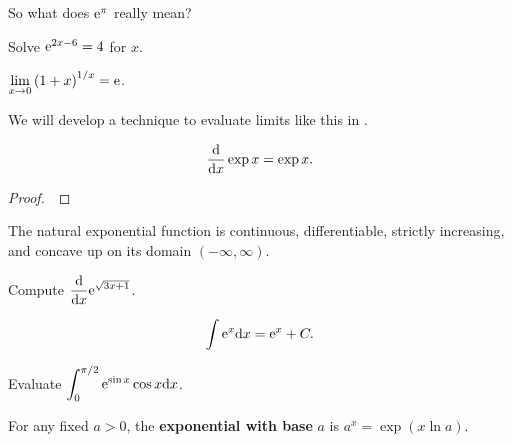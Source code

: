 \begin{example}
So what does $\mathrm{e}^\pi$ really mean?
\end{example}

\vfill


\begin{example}
Solve $\mathrm{e}^{2x-6}=4$ for $x$.
\end{example}

\vfill

\begin{theorem}
$\displaystyle\lim_{x\to 0}\left(1+x\right)^{1/x} = \mathrm{e}$.
\end{theorem}
\begin{remark}
We will develop a technique to evaluate limits like this in . 
\end{remark}

\newpage

\begin{theorem}
\begin{equation*}
\frac{\mathrm{d} }{\mathrm{d} x}\exp x = \exp x.
\end{equation*}
\end{theorem}
\begin{proof}\,

\vspace{3in}
\end{proof}

\begin{corollary}
The natural exponential function is continuous, differentiable, strictly increasing, and concave up on its domain $(-\infty, \infty)$.
\end{corollary}

\newpage

\begin{example}
Compute $\displaystyle\frac{\mathrm{d}}{\mathrm{d} x}\mathrm{e}^{\sqrt{3x+1}}$.
\end{example}
\vfill

\begin{theorem}
\begin{equation*}
\int\mathrm{e}^x\mathrm{d} x = \mathrm{e}^x + C.
\end{equation*}
\end{theorem}

\begin{example}
Evaluate $\displaystyle\int_0^{\pi/2}\mathrm{e}^{\sin x}\cos x\mathrm{d} x$.
\end{example}
\vfill



\newpage

\begin{definition}
For any fixed $a>0$, the \textbf{exponential with base} $a$ is $a^x = \exp(x\ln a)$.
\end{definition}

